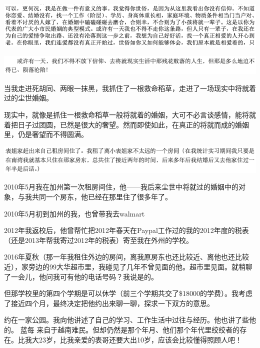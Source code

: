 \documentclass[9pt, b5paper]{article}
\begin{document}
\begin{center}
\includegraphics[width=.9\linewidth]{./pic/backups_plans_20210424_095212.png}
\end{center}

\begin{center}
\includegraphics[width=.9\linewidth]{./pic/backups_plans_20210424_095046.png}
\end{center}

当我走进死胡同、两眼一抹黑，我抓住了一根救命稻草，走进了一场现实中将就着过的尘世婚姻。

现实中，就像是抓住一根救命稻草一般将就着的婚姻，大可不必言谈感情，能将就着把日子过团圆，已然是很大的奢望。然而即使如此，在真正的将就而成的婚姻里，仍是奢望而不得圆满。

\begin{center}
\includegraphics[width=.9\linewidth]{./pic/backups_plans_20210423_202941.png}
\end{center}

2010年5月我在加州第一次租房间住，他——我后来尘世中将就过的婚姻中的对象，与我共同一个房东，他已经在那里住了很多年了。 

2010年5月初到加州的我，也曾带我去walmart

2012年我返校后，他曾帮忙把2012年春天在Paypal工作过的我的2012年度的税表（还是2013年帮我寄过2012年的税表）寄至我在外州的学校。

2016年夏秋（那一年我租住外边的房间，离我原房东也还比较近、离他也还比较近），家旁边的99大华超市里，我碰见了几年不曾见面的他。超市里见面。就稍聊了一会儿，他问我可有他的电话号码？我说是的。

但那学校里的第四个学期是可以休学（前三个学期共交了\$18000的学费）。我考虑了接近四个月，最终决定把他约出来聊一聊，探求一下双方的意思。

约在一家公园。我向他讲述了自己的学习、工作生活中过往与经历。他也讲了些他的。 
蓝每 
来自于越南难民。但却仍然是那个年月、他们那个年代里绞绞者的存在。比我大23岁，比我亲爱的表哥还要大出10岁，应该会比较懂得照顾人吧！
\end{document}
